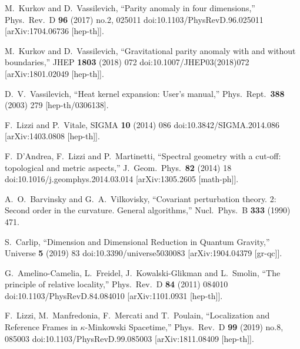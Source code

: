 \documentclass[12pt,a4paper]{article}
\begin{document}
\begin{thebibliography}{99}
M.~Kurkov and D.~Vassilevich,
  ``Parity anomaly in four dimensions,''
  Phys.\ Rev.\ D {\bf 96} (2017) no.2,  025011
  doi:10.1103/PhysRevD.96.025011
  [arXiv:1704.06736 [hep-th]].
  
  M.~Kurkov and D.~Vassilevich,
  ``Gravitational parity anomaly with and without boundaries,''
  JHEP {\bf 1803} (2018) 072
  doi:10.1007/JHEP03(2018)072
  [arXiv:1801.02049 [hep-th]].

D.~V.~Vassilevich,
  ``Heat kernel expansion: User's manual,''
  Phys.\ Rept.\  {\bf 388} (2003) 279
  [hep-th/0306138].

F.~Lizzi and P.~Vitale,
  SIGMA {\bf 10} (2014) 086
  doi:10.3842/SIGMA.2014.086
  [arXiv:1403.0808 [hep-th]].

  F.~D'Andrea, F.~Lizzi and P.~Martinetti,
  ``Spectral geometry with a cut-off: topological and metric aspects,''
  J.\ Geom.\ Phys.\  {\bf 82} (2014) 18
  doi:10.1016/j.geomphys.2014.03.014
  [arXiv:1305.2605 [math-ph]].


  A.~O.~Barvinsky and G.~A.~Vilkovisky,
  ``Covariant perturbation theory. 2: Second order in the curvature. General algorithms,''
  Nucl.\ Phys.\ B {\bf 333} (1990) 471.
  
S.~Carlip,
  ``Dimension and Dimensional Reduction in Quantum Gravity,''
  Universe {\bf 5} (2019) 83
  doi:10.3390/universe5030083
  [arXiv:1904.04379 [gr-qc]].

G.~Amelino-Camelia, L.~Freidel, J.~Kowalski-Glikman and L.~Smolin,
  ``The principle of relative locality,''
  Phys.\ Rev.\ D {\bf 84} (2011) 084010
  doi:10.1103/PhysRevD.84.084010
  [arXiv:1101.0931 [hep-th]].


F.~Lizzi, M.~Manfredonia, F.~Mercati and T.~Poulain,
  ``Localization and Reference Frames in $\kappa$-Minkowski Spacetime,''
  Phys.\ Rev.\ D {\bf 99} (2019) no.8,  085003
  doi:10.1103/PhysRevD.99.085003
  [arXiv:1811.08409 [hep-th]].

\end{thebibliography}
\end{document}
